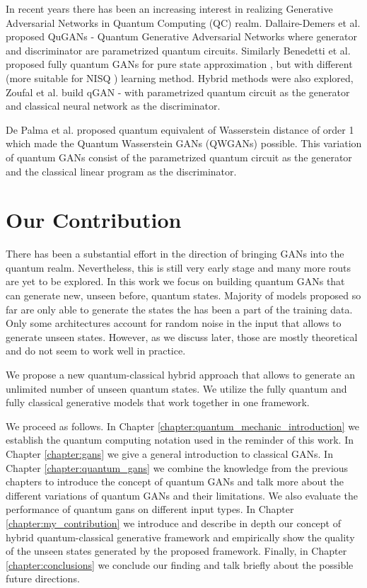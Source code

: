 In recent years there has been an increasing interest in realizing Generative
Adversarial Networks in Quantum Computing (QC) realm. Dallaire-Demers et al.
proposed QuGANs \cite{Dallaire_Demers_2018} - Quantum Generative Adversarial Networks
where generator and discriminator are parametrized quantum circuits. Similarly
Benedetti et al. proposed fully quantum GANs for pure state approximation \cite{Benedetti_2019}, but
with different (more suitable for NISQ \cite{Preskill_2018}) learning method.
Hybrid methods were also explored, Zoufal et al. build qGAN \cite{Zoufal_2019} -
with parametrized quantum circuit as the generator and classical neural network
as the discriminator. 

De Palma et al. proposed quantum equivalent of Wasserstein distance of order 1
\cite{depalma2020quantum} which made the Quantum Wasserstein GANs
(QWGANs) \cite{kiani2021quantum} possible. This variation of quantum GANs
consist of the parametrized quantum circuit as the generator and the classical linear
program as the discriminator.

\section{Our Contribution}
There has been a substantial effort in the direction of bringing GANs into the quantum
realm. Nevertheless, this is still very early stage and many more routs are yet
to be explored. In this work we focus on building quantum GANs that can generate
new, unseen before, quantum states. Majority of models proposed so far are only
able to generate the states the has been a part of the training data. Only some
architectures \cite{Dallaire_Demers_2018} account for random noise in the input
that allows to generate unseen states. However, as we discuss later, those are
mostly theoretical and do not seem to work well in practice.


We propose a new quantum-classical hybrid approach that allows to generate
an unlimited number of unseen quantum states. We utilize the fully quantum and fully
classical generative models that work together in one framework. 

We proceed as follows. In Chapter \ref{chapter:quantum_mechanic_introduction} we
establish the quantum computing notation used in the reminder of this work. In
Chapter \ref{chapter:gans} we give a general introduction to classical GANs. In
Chapter \ref{chapter:quantum_gans} we combine the knowledge from the previous
chapters to introduce the concept of quantum GANs and talk more about the
different variations of quantum GANs and their limitations. We also evaluate the
performance of quantum gans on different input types. In Chapter
\ref{chapter:my_contribution} we introduce and describe in depth our
concept of hybrid quantum-classical generative framework and empirically show the
quality of the unseen states generated by the proposed framework. Finally, in Chapter
\ref{chapter:conclusions} we conclude our finding and talk briefly about the
possible future directions. 

